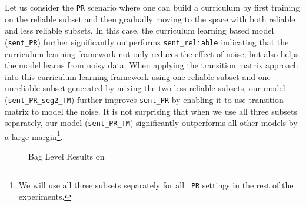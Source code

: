 Let us consider the \texttt{PR} scenario where one can build a curriculum by first training on the
reliable subset and then gradually moving to the space with both reliable and less
reliable subsets. In this case, the curriculum learning based model
(\texttt{sent\_PR}) further significantly outperforms \texttt{sent\_reliable}
indicating that the curriculum learning framework not only reduces the effect
of noise, but also helps the model learns from noisy data. When applying the
transition matrix approach into this curriculum learning framework using one reliable
subset and one unreliable subset generated by mixing the two less reliable subsets, our model (\texttt{sent\_PR\_seg2\_TM})
further improves \texttt{sent\_PR} by  %
enabling it to use transition matrix to model the noise.
It is not surprising that when we use all three subsets separately,
our model (\texttt{sent\_PR\_TM}) significantly outperforms all
other models by a large margin\footnote{We will use all three subsets separately for all
\texttt{\_PR} settings in the rest of the experiments.}.

\begin{figure}[t!]
\centering
{}
\caption{Bag Level Results on \TimeRE}
\label{fig: results_on_luo}
\end{figure}


